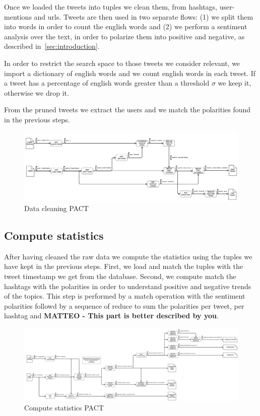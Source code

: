 Once we loaded the tweets into tuples we clean them, from hashtags, user-mentions and urls. 
Tweets are then used in two separate flows: (1) we split them into words in order to count the english words and (2) we perform a sentiment analysis over the text, in order to polarize them into positive and negative, as described in~\ref{sec:introduction}.

In order to restrict the search space to those tweets we consider relevant, we import a dictionary of english words and we count english words in each tweet. 
If a tweet has a percentage of english words greater than a threshold $\sigma$ we keep it, otherwise we drop it. 

From the pruned tweets we extract the users and we match the polarities found in the previous steps. 

\begin{figure}[ht]
\includegraphics[width=\textwidth]{images/strato_pact_pt1.png} 
\caption{Data cleaning PACT}
\label{fig:cleaning}
\end{figure}

\subsection{Compute statistics}
\label{sec:statistics}
After having cleaned the raw data we compute the statistics using the tuples we have kept in the previous steps. 
First, we load and match the tuples with the tweet timestamp we get from the database. 
Second, we compute match the hashtags with the polarities in order to understand positive and negative trends of the topics. 
This step is performed by a match operation with the sentiment polarities followd by a sequence of reduce to sum the polarities per tweet, per hashtag and {\bf MATTEO - This part is better described by you}.

\begin{figure}[ht]
\includegraphics[width=\textwidth]{images/strato_pact_pt2.png} 
\caption{Compute statistics PACT}
\label{fig:statistics}
\end{figure}
